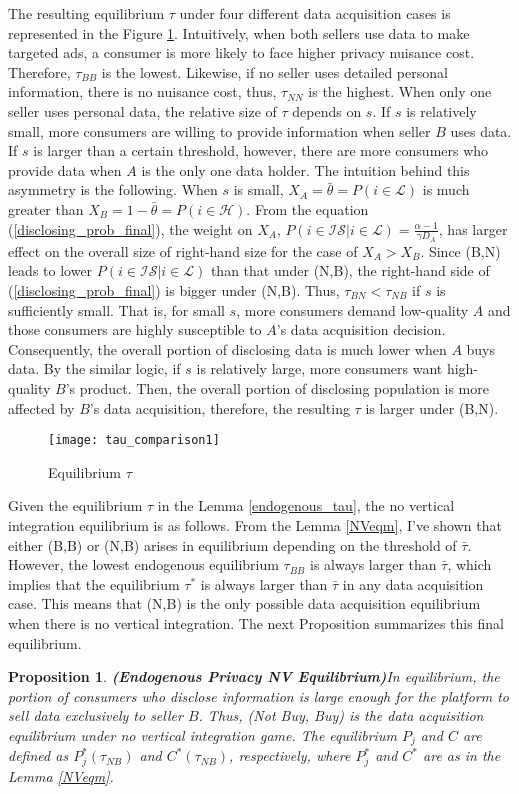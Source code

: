 \documentclass[12pt]{article}
\newtheorem{proposition}{Proposition}
\begin{document}
 The resulting equilibrium $\tau$ under four different data acquisition cases is represented in the Figure \ref{tau_comparison}. Intuitively, when both sellers use data to make targeted ads, a consumer is more likely to face higher privacy nuisance cost. Therefore, $\tau_{BB}$ is the lowest. Likewise, if no seller uses detailed personal information, there is no nuisance cost, thus, $\tau_{NN}$ is the highest. When only one seller uses personal data, the relative size of $\tau$ depends on $s$. If $s$ is relatively small, more consumers are willing to provide information when seller $B$ uses data. If $s$ is larger than a certain threshold, however, there are more consumers who provide data when $A$ is the only one data holder. The intuition behind this asymmetry is the following. When $s$ is small, $X_A=\bar{\theta}=P(i\in \mathcal{L})$ is much greater than $X_B=1-\bar{\theta}=P(i\in \mathcal{H})$. From the equation (\ref{disclosing_prob_final}), the weight on $X_A$, $P(i \in \mathcal{IS}|i \in \mathcal{L})=\frac{\alpha-1}{\gamma D_A}$, has larger effect on the overall size of right-hand size for the case of $X_A>X_B$. Since (B,N) leads to lower $P(i \in \mathcal{IS}|i \in \mathcal{L})$ than that under (N,B), the right-hand side of (\ref{disclosing_prob_final}) is bigger under (N,B). Thus, $\tau_{BN}<\tau_{NB}$ if $s$ is sufficiently small. That is, for small $s$, more consumers demand low-quality $A$ and those consumers are highly susceptible to $A$'s data acquisition decision. Consequently, the overall portion of disclosing data is much lower when $A$ buys data. By the similar logic, if $s$ is relatively large, more consumers want high-quality $B$'s product. Then, the overall portion of disclosing population is more affected by $B$'s data acquisition, therefore, the resulting $\tau$ is larger under (B,N). 
			\begin{figure}[!tbp]
				\centering
		\texttt{[image: tau\_comparison1]}
	\caption{Equilibrium $\tau$ }\label{tau_comparison}
\end{figure}

Given the equilibrium $\tau$ in the Lemma \ref{endogenous_tau}, the no vertical integration equilibrium is as follows. From the Lemma \ref{NVeqm}, I've shown that either (B,B) or (N,B) arises in equilibrium depending on the threshold of $\bar{\tau}$. However, the lowest endogenous equilibrium $\tau_{BB}$ is always larger than $\bar{\tau}$, which implies that the equilibrium $\tau^*$ is always larger than $\bar{\tau}$ in any data acquisition case. This means that (N,B) is the only possible data acquisition equilibrium when there is no vertical integration. The next Proposition summarizes this final equilibrium.  
\begin{proposition}\textbf{(Endogenous Privacy NV Equilibrium)}\label{endogenous_no_VI_prop}
	In equilibrium, the portion of consumers who disclose information is large enough for the platform to sell data exclusively to seller $B$. Thus, (Not Buy, Buy) is the data acquisition equilibrium under no vertical integration game. The equilibrium $P_j$ and $C$ are defined as $P_j^*(\tau_{NB})$ and $C^*(\tau_{NB})$, respectively, where $P_j^*$ and $C^*$ are as in the Lemma \ref{NVeqm}. 
\end{proposition}
\end{document}

